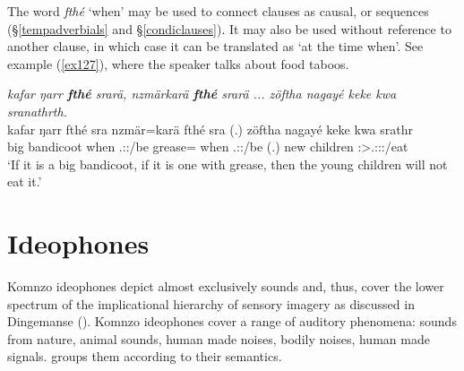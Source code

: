 The word \emph{fthé} `when' may be used to connect clauses as causal,  or  sequences (\S\ref{tempadverbials} and \S\ref{condiclauses}). It may also be used without reference to another clause, in which case it can be translated as `at the time when'. See example (\ref{ex127}), where the speaker talks about food taboos.

\begin{exe}
	\ex \emph{kafar ŋarr \textbf{fthé} srarä, nzmärkarä \textbf{fthé} srarä ... zöftha nagayé keke kwa sranathrth.}\\
	\gll kafar ŋarr fthé sra nzmär=karä fthé sra (.) zöftha nagayé keke kwa srathr\\
	big bandicoot when \Tsg.\Masc:\Irr:\Ipfv/be grease={\Prop} when \Tsg.\Masc:\Irr:\Ipfv/be (.) new children {\Neg} {\Fut} \Stsg:\Sbj>\Tsg.\Masc:\Obj:\Irr:\Ipfv/eat\\
	\trans `If it is a big bandicoot, if it is one with grease, then the young children will not eat it.' 
	\label{ex127}
\end{exe}

\section{Ideophones} \label{ideophones-sec}

Komnzo ideophones depict almost exclusively sounds and, thus, cover the lower spectrum of the implicational hierarchy of sensory imagery as discussed in Dingemanse (\citeyear[663]{Dingemanse:2012fc}). Komnzo ideophones cover a range of auditory phenomena: sounds from nature, animal sounds, human made noises, bodily noises, human made signals.  groups them according to their semantics.




